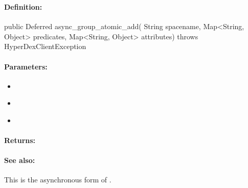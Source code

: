 \pagebreak
\subsubsection{}
\label{api:java:async_group_atomic_add}


\paragraph{Definition:}
\begin{javacode}
public Deferred async_group_atomic_add(
        String spacename,
        Map<String, Object> predicates,
        Map<String, Object> attributes) throws HyperDexClientException
\end{javacode}

\paragraph{Parameters:}
\begin{itemize}[noitemsep]
\item {}\\

\item {}\\

\item {}\\

\end{itemize}

\paragraph{Returns:}


\paragraph{See also:}  This is the asynchronous form of .

\pagebreak
\subsubsection{}
\label{api:java:atomic_add}


